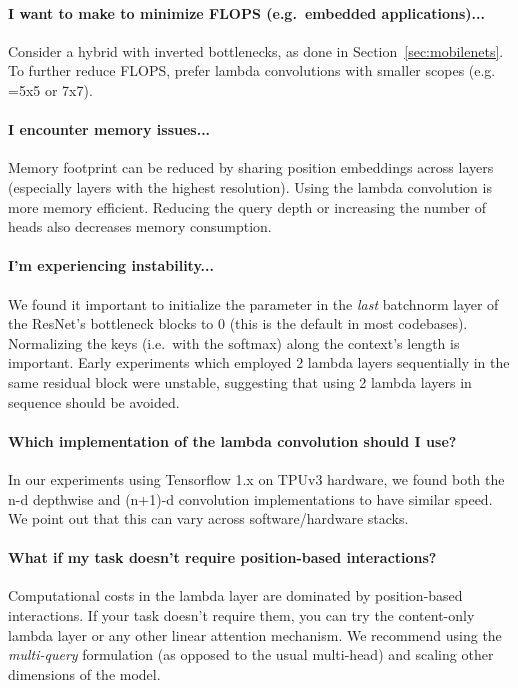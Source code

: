 \documentclass{article} \usepackage{iclr2021_conference,times}
\begin{document}
\paragraph{I want to make to minimize FLOPS (e.g.\ embedded applications)...}
Consider a hybrid with inverted bottlenecks, as done in Section~\ref{sec:mobilenets}.
To further reduce FLOPS, prefer lambda convolutions with smaller scopes (e.g. =5x5 or 7x7).

\paragraph{I encounter memory issues...}
Memory footprint can be reduced by sharing position embeddings across layers (especially layers with the highest resolution).
Using the lambda convolution is more memory efficient.
Reducing the query depth  or increasing the number of heads  also decreases memory consumption.

\paragraph{I'm experiencing instability...}
We found it important to initialize the  parameter in the \emph{last} batchnorm layer of the ResNet's bottleneck blocks to 0 (this is the default in most codebases).
Normalizing the keys (i.e.\ with the softmax) along the context's length is important. 
Early experiments which employed 2 lambda layers sequentially in the same residual block were unstable, suggesting that using 2 lambda layers in sequence should be avoided.

\paragraph{Which implementation of the lambda convolution should I use?}
In our experiments using Tensorflow 1.x on TPUv3 hardware, we found both the n-d depthwise and (n+1)-d convolution implementations to have similar speed.
We point out that this can vary across software/hardware stacks.

\paragraph{What if my task doesn't require position-based interactions?}
Computational costs in the lambda layer are dominated by position-based interactions.
If your task doesn't require them, you can try the content-only lambda layer or any other linear attention mechanism.
We recommend using the \emph{multi-query} formulation (as opposed to the usual multi-head) and scaling other dimensions of the model. \newpage
\end{document}

